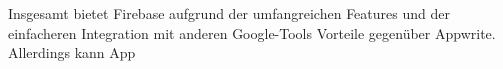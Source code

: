 
Insgesamt bietet Firebase aufgrund der umfangreichen Features und der einfacheren Integration mit anderen Google-Tools Vorteile gegenüber Appwrite. Allerdings kann App


